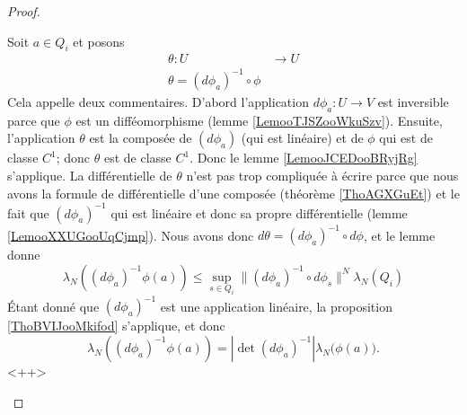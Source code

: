 \begin{proof}
\begin{enumerate}
\begin{subproof}
                Soit \( a\in Q_i\) et posons
                \begin{equation}
                    \begin{aligned}
                        \theta\colon U&\to U \\
                        \theta=(d\phi_{a})^{-1}\circ\phi 
                    \end{aligned}
                \end{equation}
                Cela appelle deux commentaires. D'abord l'application \( d\phi_{a}\colon U\to V\) est inversible parce que \( \phi\) est un difféomorphisme (lemme \ref{LemooTJSZooWkuSzv}). Ensuite, l'application \( \theta\) est la composée de \( (d\phi_{a})\) (qui est linéaire) et de \( \phi\) qui est de classe \( C^1\); donc \( \theta\) est de classe \( C^1\). Donc le lemme \ref{LemooJCEDooBRyjRg} s'applique. La différentielle de \( \theta\) n'est pas trop compliquée à écrire parce que nous avons la formule de différentielle d'une composée (théorème \ref{ThoAGXGuEt}) et le fait que \( (d\phi_{a})^{-1}\) qui est linéaire et donc sa propre différentielle (lemme \ref{LemooXXUGooUqCjmp}). Nous avons donc \( d\theta=(d\phi_a)^{-1}\circ d\phi\), et le lemme donne
                \begin{equation}
                    \lambda_N\left( (d\phi_a)^{-1}\phi(a) \right)\leq \sup_{s\in Q_i}\|    (d\phi_a)^{-1}\circ d\phi_s  \|^N\lambda_N(Q_i)
                \end{equation}
                Étant donné que \( (d\phi_a)^{-1}\) est une application linéaire, la proposition \ref{ThoBVIJooMkifod} s'applique, et donc
                \begin{equation}
                    \lambda_N\left( (d\phi_a)^{-1}\phi(a) \right)=| \det(d\phi_a)^{-1} |\lambda_N\big( \phi(a) \big).
                \end{equation}
                <++>


\end{subproof}
\end{enumerate}
\end{proof}
